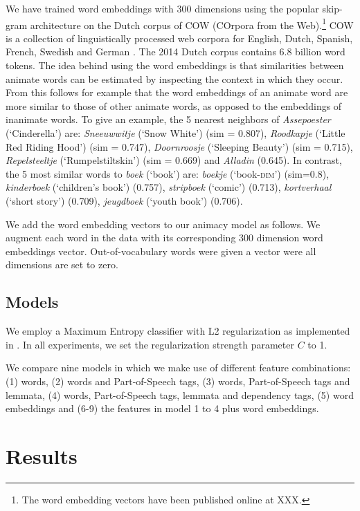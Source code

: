 \documentclass[a4paper,UKenglish]{oasics}
\begin{document}

We have trained word embeddings with 300 dimensions using the popular
skip-gram architecture \cite{mikolov:13} on the Dutch corpus of COW
(COrpora from the Web).\footnote{The word embedding vectors have been
  published online at XXX.} COW is a collection of linguistically
processed web corpora for English, Dutch, Spanish, French, Swedish and
German \cite{schaefer:12}. The 2014 Dutch corpus contains 6.8 billion
word tokens. The idea behind using the word embeddings is that
similarities between animate words can be estimated by inspecting the
context in which they occur. From this follows for example that the word
embeddings of an animate word are more similar to those of other
animate words, as opposed to the embeddings of inanimate words. To give an
example, the 5 nearest neighbors of \textit{Assepoester}
(`Cinderella') are: \textit{Sneeuwwitje} (`Snow White') (sim = 0.807),
\textit{Roodkapje} (`Little Red Riding Hood') (sim = 0.747),
\textit{Doornroosje} (`Sleeping Beauty') (sim = 0.715),
\textit{Repelsteeltje} (`Rumpelstiltskin') (sim = 0.669) and
\textit{Alladin} (0.645). In contrast, the 5 most similar words to
\textit{boek} (`book') are: \textit{boekje} (`book-\textsc{dim}')
(sim=0.8), \textit{kinderboek} (`children's book') (0.757),
\textit{stripboek} (`comic') (0.713), \textit{kortverhaal} (`short
story') (0.709), \textit{jeugdboek} (`youth book') (0.706).

We add the word embedding vectors to our animacy model as follows. We
augment each word in the data with its corresponding 300 dimension
word embeddings vector. Out-of-vocabulary words were given a vector were all dimensions are set to zero.


\subsection{Models}
We employ a Maximum Entropy classifier with L2 regularization as
implemented in \cite{sklearn}. In all experiments, we set the
regularization strength parameter $C$ to 1.

We compare nine models in which we make use of different feature
combinations: (1) words, (2) words and Part-of-Speech tags, (3)
words, Part-of-Speech tags and lemmata, (4) words, Part-of-Speech
tags, lemmata and dependency tags, (5) word embeddings and (6-9) the
features in model 1 to 4 plus word embeddings.


\section{Results}\label{sec:results}
\end{document}
